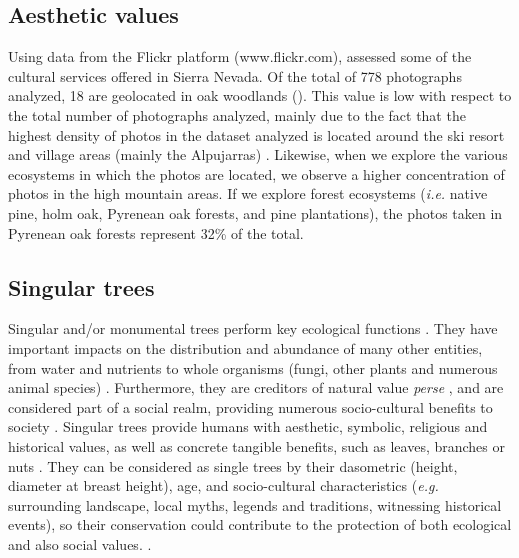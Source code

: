 \subsection{Aesthetic values}\label{sec:es:cultural-aesthetic} 
Using data from the Flickr platform (www.flickr.com), \citet{MorenoLlorcaetal2020EvaluatingTourist} assessed some of the cultural services offered in Sierra Nevada. Of the total of 778 photographs analyzed, 18 are geolocated in oak woodlands (). This value is low with respect to the total number of photographs analyzed, mainly due to the fact that the highest density of photos in the dataset analyzed is located around the ski resort and village areas (mainly the Alpujarras) \autocites{RosCandeiraetal2020SocialMedia}. Likewise, when we explore the various ecosystems in which the photos are located, we observe a higher concentration of photos in the high mountain areas. If we explore forest ecosystems (\emph{i.e.} native pine, holm oak, Pyrenean oak forests, and pine plantations), the photos taken in Pyrenean oak forests represent 32\% of the total.

\subsection{Singular trees}\label{sec:es:cultural-trees} 
Singular and/or monumental trees perform key ecological functions \autocites[\emph{e.g.} nutrient cycling; support complex assemblages of species,][]{Zapponietal2017RoleMonumental}. They have important impacts on the distribution and abundance of many other entities, from water and nutrients to whole organisms (fungi, other plants and numerous animal species) \autocites{LindenmayerLaurance2017EcologyDistribution}. Furthermore, they are creditors of natural value \emph{perse} \autocites{Asciutoetal2016MonumentalTrees}, and are considered part of a social realm, providing numerous socio-cultural benefits to society \autocites{BlicharskaMikusinski2014IncorporatingSocial,MoyaMoya2013MonumentalTrees}. Singular trees provide humans with aesthetic, symbolic, religious and historical values, as well as concrete tangible benefits, such as leaves, branches or nuts \autocites{BlicharskaMikusinski2014IncorporatingSocial}. They can be considered as single trees by their dasometric (height, diameter at breast height), age, and socio-cultural characteristics (\emph{e.g.} surrounding landscape, local myths, legends and traditions, witnessing historical events), so their conservation could contribute to the protection of both ecological and also social values. \autocites{BlicharskaMikusinski2014IncorporatingSocial}. 

